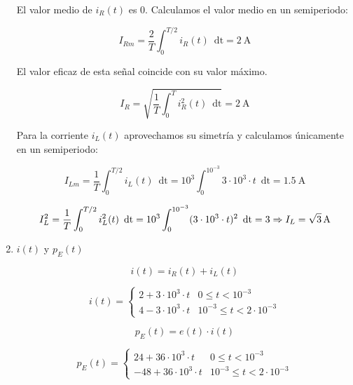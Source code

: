 \documentclass[10pt]{article}
\begin{document}
\begin{enumerate}
  El valor medio de $i_R(t)$ es 0. Calculamos el valor medio en un semiperiodo:

  \[
    I_{Rm} = \frac{2}{T} \int_0^{T/2} i_R(t) \enspace \mathrm{dt} = \SI{2}{\ampere} 
  \]

  El valor eficaz de esta señal coincide con su valor máximo.

  \[
    I_R = \sqrt{\frac{1}{T} \int_0^T i^2_R(t) \enspace \mathrm{dt}} = \SI{2}{\ampere} 
  \]

  Para la corriente $i_L(t)$ aprovechamos su simetría y calculamos únicamente en un semiperiodo:

    \[
      I_{Lm} = \frac{1}{T} \int_0^{T/2} i_L(t) \enspace \mathrm{dt} = 10^3 \int_0^{10^{-3}} 3 \cdot 10 ^3 \cdot t \enspace \mathrm{dt} = \SI{1.5}{\ampere} 
  \]

      \[
      I^2_L = \frac{1}{T} \int_0^{T/2} i^2_L(t) \enspace \mathrm{dt} = 10^3 \int_0^{10^{-3}} (3 \cdot 10 ^3 \cdot t)^2 \enspace \mathrm{dt} = 3 \Rightarrow I_L = \SI[parse-numbers=false]{\sqrt{3}}{\ampere} 
  \]

  
\item $i(t)$ y $p_E(t)$

  \[
    i(t) = i_R(t) + i_L(t)
  \]

  \[
    i(t) = %
    \begin{cases}
      2 + 3\cdot 10^3 \cdot t &  0 \leq t < 10^{-3}\\ 
      4 - 3\cdot 10^3 \cdot t & 10^{-3} \leq t < 2 \cdot 10^{-3}
    \end{cases}
  \]

  \[
    p_E(t) = e(t) \cdot i(t)
  \]
  
  \[
    p_E(t) = %
    \begin{cases}
      24 + 36\cdot 10^3 \cdot t &  0 \leq t < 10^{-3}\\ 
      -48 + 36\cdot 10^3 \cdot t & 10^{-3} \leq t < 2 \cdot 10^{-3}
    \end{cases}
  \]

\end{enumerate}
\end{document}
